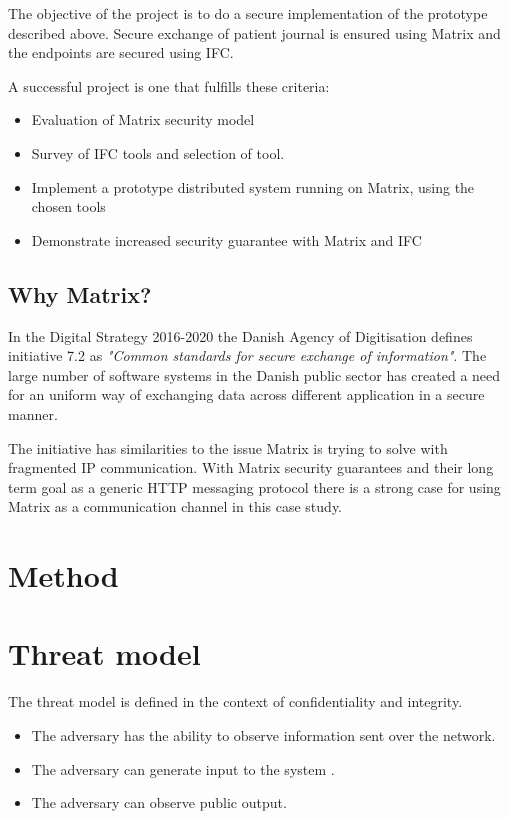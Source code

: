 The objective of the project is to do a secure implementation of the prototype described above. Secure exchange of patient journal is ensured using Matrix and the endpoints are secured using IFC.

A successful project is one that fulfills these criteria: 

\begin{itemize}
	\item Evaluation of Matrix security model
	\item Survey of IFC tools and selection of tool.
	\item Implement a prototype distributed system running on Matrix, using the chosen tools
	\item Demonstrate increased security guarantee with Matrix and IFC
\end{itemize}   


\subsection{Why Matrix?}
In the Digital Strategy 2016-2020 the Danish Agency of Digitisation defines initiative 7.2 as \emph{"Common standards for secure exchange of information"}. The large number of software systems in the Danish public sector has created a need for an uniform way of exchanging data across different application in a secure manner\cite{TheGovernment2016}. 

The initiative has similarities to the issue Matrix is trying to solve with fragmented IP communication. With Matrix security guarantees and their long term goal as a generic HTTP messaging protocol there is a strong case for using Matrix as a communication channel in this case study.


 
\section{Method}
 
 \section{Threat model}
 The threat model is defined in the context of confidentiality and integrity.
 \begin{itemize}
 	\item The adversary has the ability to observe information sent over the network.
 	\item The adversary can generate input to the system .
 	\item The adversary can observe public output.   
 \end{itemize}
 
